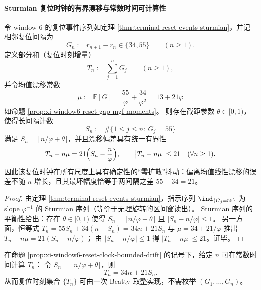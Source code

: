 \paragraph{Sturmian 复位时钟的有界漂移与常数时间可计算性}

\begin{proposition}\label{prop:xi-window6-reset-clock-bounded-drift}
令 window-\(6\) 的复位事件序列如定理 \ref{thm:terminal-reset-events-sturmian}，并记相邻复位间隔为
\[
G_n:=r_{n+1}-r_n\in\{34,55\}\qquad(n\ge 1).
\]
定义部分和（复位时刻增量）
\[
T_n:=\sum_{j=1}^{n}G_j\qquad(n\ge 1),
\]
并令均值漂移常数
\[
\mu:=\mathbb E[G]=\frac{55}{\varphi}+\frac{34}{\varphi^2}=13+21\varphi
\]
如命题 \ref{prop:xi-window6-reset-gap-mgf-moments}。
则存在截距参数 \(\theta\in[0,1)\)，使得长间隔计数
\[
S_n:=\#\{1\le j\le n:\ G_j=55\}
\]
满足 \(S_n=\lfloor n/\varphi+\theta\rfloor\)，并且漂移偏差具有统一有界性
\[
T_n-n\mu=21\Bigl(S_n-\frac{n}{\varphi}\Bigr),
\qquad
\bigl|T_n-n\mu\bigr|\le 21
\quad(\forall n\ge 1).
\]
因此该复位时钟在所有尺度上具有确定性的“零扩散”抖动：偏离均值线性漂移的误差不随 \(n\) 增长，且其最坏幅度恰等于两间隔之差 \(55-34=21\)。
\end{proposition}

\begin{proof}
由定理 \ref{thm:terminal-reset-events-sturmian}，指示序列 \(\ind_{\{G_j=55\}}\) 为 slope \(\varphi^{-1}\) 的 Sturmian 序列（等价于无理旋转的区间窗读出）。
Sturmian 序列的平衡性给出：存在 \(\theta\in[0,1)\) 使得
\(
S_n=\lfloor n/\varphi+\theta\rfloor
\)
且 \(|S_n-n/\varphi|\le 1\)。
另一方面，恒等式 \(T_n=55S_n+34(n-S_n)=34n+21S_n\) 与 \(\mu=34+21/\varphi\) 推出
\(
T_n-n\mu=21(S_n-n/\varphi)
\)；
由 \(|S_n-n/\varphi|\le 1\) 得 \(|T_n-n\mu|\le 21\)。证毕。
\end{proof}

\begin{corollary}\label{cor:xi-window6-reset-clock-O1-computable}
在命题 \ref{prop:xi-window6-reset-clock-bounded-drift} 的记号下，给定 \(n\) 可在常数时间计算 \(T_n\)：
令 \(S_n=\lfloor n/\varphi+\theta\rfloor\)，则
\[
T_n=34n+21S_n.
\]
从而复位时刻集合 \(\{T_n\}\) 可由一次 Beatty 取整实现，不需枚举 \((G_1,\dots,G_n)\)。
\end{corollary}

